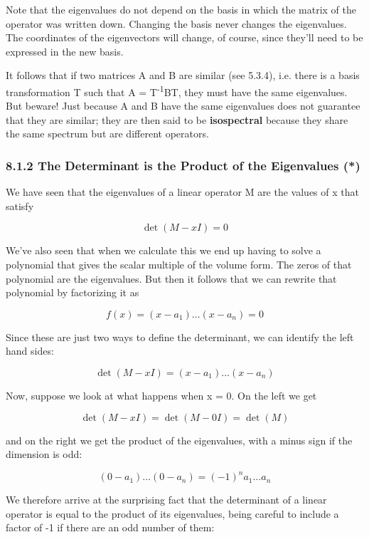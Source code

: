 \documentclass[oneside,english]{amsbook}
\numberwithin{section}{chapter}
\theoremstyle{plain}
\theoremstyle{definition}
\begin{document}
Note that the eigenvalues do not depend on the basis in which the matrix
of the operator was written down. Changing the basis never changes the
eigenvalues. The coordinates of the eigenvectors will change, of course,
since they'll need to be expressed in the new basis.

It follows that if two matrices A and B are similar (see 5.3.4), i.e.
there is a basis transformation T such that A = T\textsuperscript{-1}BT,
they must have the same eigenvalues. But beware! Just because A and B
have the same eigenvalues does not guarantee that they are similar; they
are then said to be \textbf{isospectral} because they share the same
spectrum but are different operators.

\subsubsection{8.1.2 The Determinant is the Product of the Eigenvalues
	(*)}\label{the-determinant-is-the-product-of-the-eigenvalues}

We have seen that the eigenvalues of a linear operator M are the values
of x that satisfy

\[\det(M - xI) = 0\]

We've also seen that when we calculate this we end up having to solve a
polynomial that gives the scalar multiple of the volume form. The zeros
of that polynomial are the eigenvalues. But then it follows that we can
rewrite that polynomial by factorizing it as

\[f(x) = \left( x - a_{1} \right)\ldots\left( x - a_{n} \right) = 0\]

Since these are just two ways to define the determinant, we can identify
the left hand sides:

\[\det(M - xI) = \left( x - a_{1} \right)\ldots\left( x - a_{n} \right)\]

Now, suppose we look at what happens when x = 0. On the left we get

\[\det(M - xI) = \det(M - 0I) = \det(M)\]

and on the right we get the product of the eigenvalues, with a minus
sign if the dimension is odd:

\[\left( 0 - a_{1} \right)\ldots\left( 0 - a_{n} \right) = ( - 1)^{n}a_{1}\ldots a_{n}\]

We therefore arrive at the surprising fact that the determinant of a
linear operator is equal to the product of its eigenvalues, being
careful to include a factor of -1 if there are an odd number of them:
\end{document}

